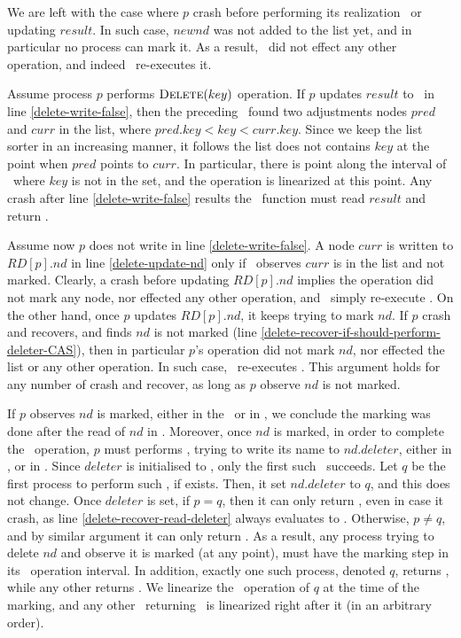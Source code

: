 We are left with the case where $p$ crash before performing its realization \CAS\ or updating $result$. In such case, $newnd$ was not added to the list yet, and in particular no process can mark it. As a result, \insertlst\ did not effect any other operation, and indeed \insertrecover\ re-executes it.

Assume process $p$ performs $\mbox{\sc Delete}(key)$ operation. If $p$ updates $result$ to \False\ in line \ref{delete-write-false}, then the preceding \search\ found two adjustments nodes $pred$ and $curr$ in the list, where $pred.key < key < curr.key$. Since we keep the list sorter in an increasing manner, it follows the list does not contains $key$ at the point when $pred$ points to $curr$. In particular, there is point along the interval of \delete\ where $key$ is not in the set, and the operation is linearized at this point. Any crash after line \ref{delete-write-false} results the \deleterecover\ function must read $result$ and return \False.

Assume now $p$ does not write in line \ref{delete-write-false}. A node $curr$ is written to $RD[p].nd$ in line \ref{delete-update-nd} only if \search\ observes $curr$ is in the list and not marked. Clearly, a crash before updating $RD[p].nd$ implies the operation did not mark any node, nor effected any other operation, and \deleterecover\ simply re-execute \delete. On the other hand, once $p$ updates $RD[p].nd$, it keeps trying to mark $nd$.
If $p$ crash and recovers, and finds $nd$ is not marked (line \ref{delete-recover-if-should-perform-deleter-CAS}), then in particular $p$'s operation did not mark $nd$, nor effected the list or any other operation. In such case, \deleterecover\ re-executes \delete. This argument holds for any number of crash and recover, as long as $p$ observe $nd$ is not marked.

If $p$ observes $nd$ is marked, either in the \delete\ or in \deleterecover, we conclude the marking was done after the read of $nd$ in \search. Moreover, once $nd$ is marked, in order to complete the \delete\ operation, $p$ must performs \CAS, trying to write its name to $nd.deleter$, either in \delete, or in \deleterecover. Since $deleter$ is initialised to \init, only the first such \CAS\ succeeds.
Let $q$ be the first process to perform such \CAS, if exists. Then, it set $nd.deleter$ to $q$, and this does not change. Once $deleter$ is set, if $p=q$, then it can only return \True, even in case it crash, as line \ref{delete-recover-read-deleter} always evaluates to \True. Otherwise, $p \neq q$, and by similar argument it can only return \False.
As a result, any process trying to delete $nd$ and observe it is marked (at any point), must have the marking step in its \delete\ operation interval. In addition, exactly one such process, denoted $q$, returns \True, while any other returns \False. We linearize the \delete\ operation of $q$ at the time of the marking, and any other \delete\ returning \False\ is linearized right after it (in an arbitrary order).







